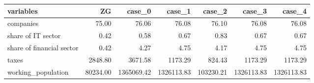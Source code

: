 \begin{tabular}{lrrrrrr}
\toprule
                variables &       ZG &     case\_0 &     case\_1 &    case\_2 &     case\_3 &     case\_4 \\
\midrule
                companies &    75.00 &      76.06 &      76.08 &     76.10 &      76.08 &      76.08 \\
       share of IT sector &     0.42 &       0.58 &       0.67 &      0.83 &       0.67 &       0.67 \\
share of financial sector &     0.42 &       4.27 &       4.75 &      4.17 &       4.75 &       4.75 \\
                    taxes &  2848.80 &    3671.58 &    1173.29 &    824.43 &    1173.29 &    1173.29 \\
       working\_population & 80234.00 & 1365069.42 & 1326113.83 & 103230.21 & 1326113.83 & 1326113.83 \\
\bottomrule
\end{tabular}
